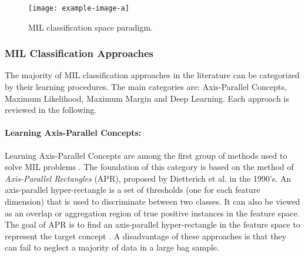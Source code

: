 \begin{center}
	\begin{figure*}[h]
		\centering
		\texttt{[image: example-image-a]}
		\caption[MIL classification space paradigm.]{MIL classification space paradigm.}
		\label{fig:mil_classification_space_paradigm}
	\end{figure*}
\end{center}

\subsubsection{MIL Classification Approaches}
The majority of MIL classification approaches in the literature can be categorized by their learning procedures.  The main categories are: Axis-Parallel Concepts, Maximum Likelihood, Maximum Margin and Deep Learning.  Each approach is reviewed in the following.

\paragraph{Learning Axis-Parallel Concepts:}
Learning Axis-Parallel Concepts are among the first group of methods used to solve MIL problems \citep{Dietterich1996AxisParallelRectangles}.  The foundation of this category is based on the method of \textit{Axis-Parallel Rectangles} (APR), proposed by Dietterich et al. in the 1990's.  An axis-parallel hyper-rectangle is a set of thresholds (one for each feature dimension) that is used to discriminate between two classes. It can also be viewed as an overlap or aggregation region of true positive instances in the feature space. The goal of APR is to find an axis-parallel hyper-rectangle in the feature space to represent the target concept \citep{Ghaffarzadegan2018MILVAE, Bocinsky2019SPIEMIACEInitialization, Jiao2017Thesis}.  A disadvantage of these approaches is that they can fail to neglect a majority of data in a large bag sample.    

